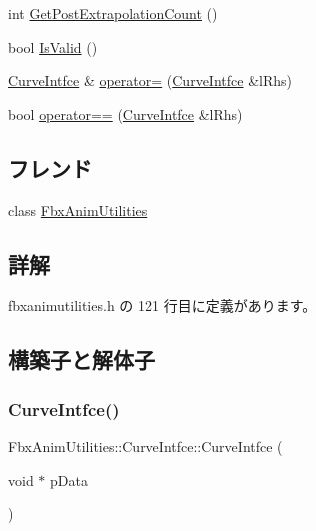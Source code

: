 \begin{DoxyCompactItemize}
\item 
int \hyperlink{class_fbx_anim_utilities_1_1_curve_intfce_af0138ff660c5ea80bab90abfdead87c0}{Get\+Post\+Extrapolation\+Count} ()
\item 
bool \hyperlink{class_fbx_anim_utilities_1_1_curve_intfce_aea0db520834b8dc5b8a7e55567a74036}{Is\+Valid} ()
\item 
\hyperlink{class_fbx_anim_utilities_1_1_curve_intfce}{Curve\+Intfce} \& \hyperlink{class_fbx_anim_utilities_1_1_curve_intfce_a0917c685f7bc760a34bf2faf9278eb2c}{operator=} (\hyperlink{class_fbx_anim_utilities_1_1_curve_intfce}{Curve\+Intfce} \&l\+Rhs)
\item 
bool \hyperlink{class_fbx_anim_utilities_1_1_curve_intfce_a631e6326758efb7b2e6ee97bc183d976}{operator==} (\hyperlink{class_fbx_anim_utilities_1_1_curve_intfce}{Curve\+Intfce} \&l\+Rhs)
\end{DoxyCompactItemize}
\subsection*{フレンド}
\begin{DoxyCompactItemize}
\item 
class \hyperlink{class_fbx_anim_utilities_1_1_curve_intfce_aeacafd3baeb97bc8863c00bb6de0073d}{Fbx\+Anim\+Utilities}
\end{DoxyCompactItemize}


\subsection{詳解}


 fbxanimutilities.\+h の 121 行目に定義があります。



\subsection{構築子と解体子}
\mbox{\label{class_fbx_anim_utilities_1_1_curve_intfce_abe47bbd049aff725a33efffae4b1e8cd}} 
\subsubsection{\texorpdfstring{Curve\+Intfce()}{CurveIntfce()}\hspace{0.1cm}{\footnotesize\ttfamily [1/2]}}
{\footnotesize\ttfamily Fbx\+Anim\+Utilities\+::\+Curve\+Intfce\+::\+Curve\+Intfce (\begin{DoxyParamCaption}\item[{void $\ast$}]{p\+Data }\end{DoxyParamCaption})}

